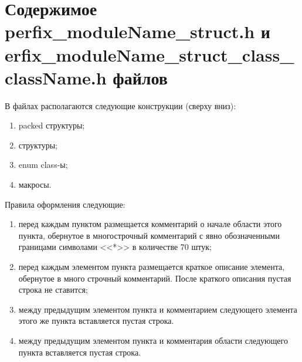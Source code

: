 \section{Содержимое perfix\_moduleName\_struct.h и\\erfix\_moduleName\_struct\_class\_className.h файлов}\label{p:struc:h}
В файлах располагаются следующие конструкции (сверху вниз):
\begin{enumerate}
	\item packed структуры;
	\item структуры;
	\item enum class-ы;
	\item макросы.
\end{enumerate}
Правила оформления следующие:
\begin{enumerate}
	\item перед каждым пунктом размещается комментарий о начале области этого пункта, обернутое в многострочный комментарий с явно обозначенными границами символами <<*>> в количестве 70 штук;
	\item перед каждым элементом пункта размещается краткое описание элемента, обернутое в много строчный комментарий. После краткого описания пустая строка не ставится;
	\item между предыдущим элементом пункта и комментарием следующего элемента этого же пункта вставляется пустая строка.
	\item между предыдущим элементом пункта и комментария области следующего пункта вставляется пустая строка.
\end{enumerate}
